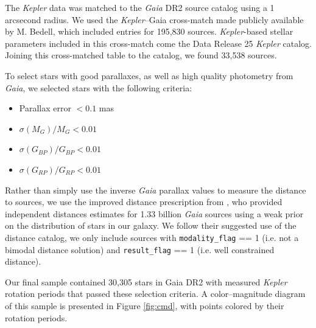 \documentclass[preprint2]{aastex62}
\newcommand{\Kepler}{\textsl{Kepler}\xspace}
\begin{document}
The \Kepler data was matched to the {\em Gaia} DR2 source catalog using a 1 arcsecond radius. We used the \Kepler--Gaia cross-match made publicly available by M. Bedell, which included entries for 195,830 sources. \Kepler-based stellar parameters included in this cross-match come the Data Release 25 \Kepler catalog. Joining this cross-matched table to the \citet{mcquillan2014} catalog, we found 33,538 sources.

To select stars with good parallaxes, as well as high quality photometry from {\em Gaia}, we selected stars with the following criteria:
\begin{itemize}
\item Parallax error $< 0.1$ mas
\item $\sigma(M_{G}) / M_{G} < 0.01$
\item $\sigma(G_{BP}) /G_{BP} < 0.01$
\item $\sigma(G_{RP}) /G_{RP} < 0.01$
\end{itemize}

Rather than simply use the inverse {\em Gaia} parallax values to measure the distance to sources, we use the improved distance prescription from \citet{bailer-jones2018}, who provided independent distances estimates for 1.33 billion {\em Gaia} sources using a weak prior on the distribution of stars in our galaxy. We follow their suggested use of the distance catalog, we only include sources with {\tt modality\_flag} == 1 (i.e. not a bimodal distance solution) and {\tt result\_flag} == 1 (i.e. well constrained distance).
              

Our final sample contained 30,305 stars in Gaia DR2 with measured \Kepler rotation periods that passed these selection criteria. A color--magnitude diagram of this sample is presented in Figure \ref{fig:cmd}, with points colored by their rotation periods.
\end{document}
